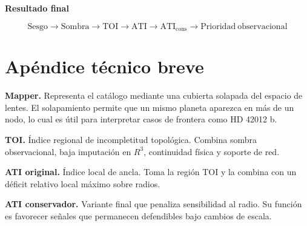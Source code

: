 \documentclass[11pt,letterpaper]{article}
\begin{document}
\begin{resultbox}
\centering
\Large
\textbf{Resultado final}\par
\normalsize
\vspace{0.35em}
\[
\boxed{\mathrm{Sesgo}\rightarrow\mathrm{Sombra}\rightarrow\mathrm{TOI}\rightarrow\mathrm{ATI}\rightarrow\mathrm{ATI}_{\mathrm{cons}}\rightarrow\mathrm{Prioridad\ observacional}}
\]
\end{resultbox}

\appendix
\section{Apéndice técnico breve}

\textbf{Mapper.} Representa el catálogo mediante una cubierta solapada del espacio de lentes. El solapamiento permite que un mismo planeta aparezca en más de un nodo, lo cual es útil para interpretar casos de frontera como HD 42012 b.

\textbf{TOI.} Índice regional de incompletitud topológica. Combina sombra observacional, baja imputación en $R^3$, continuidad física y soporte de red.

\textbf{ATI original.} Índice local de ancla. Toma la región TOI y la combina con un déficit relativo local máximo sobre radios.

\textbf{ATI conservador.} Variante final que penaliza sensibilidad al radio. Su función es favorecer señales que permanecen defendibles bajo cambios de escala.
\end{document}
